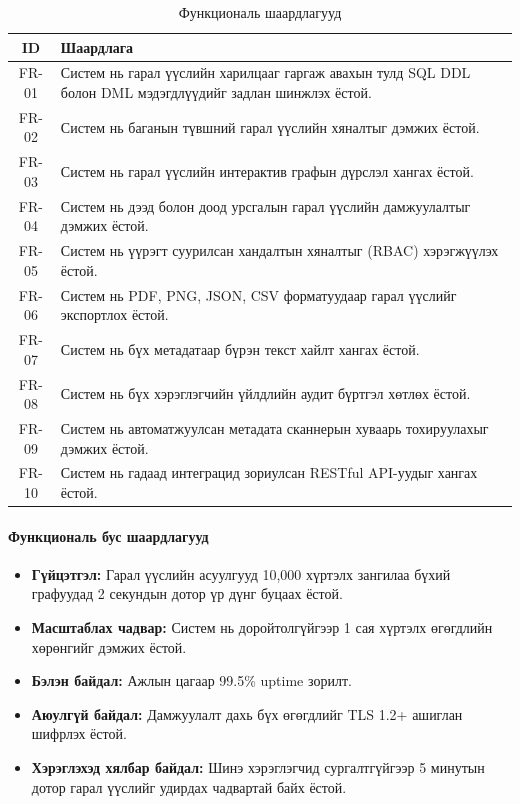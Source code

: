 \begin{table}[htbp]
\centering
\caption{Функциональ шаардлагууд}
\label{tab:functional_req}
\begin{tabular}{|c|p{10cm}|}
\hline
\textbf{ID} & \textbf{Шаардлага} \\
\hline
FR-01 & Систем нь гарал үүслийн харилцааг гаргаж авахын тулд SQL DDL болон DML мэдэгдлүүдийг задлан шинжлэх ёстой. \\
\hline
FR-02 & Систем нь баганын түвшний гарал үүслийн хяналтыг дэмжих ёстой. \\
\hline
FR-03 & Систем нь гарал үүслийн интерактив графын дүрслэл хангах ёстой. \\
\hline
FR-04 & Систем нь дээд болон доод урсгалын гарал үүслийн дамжуулалтыг дэмжих ёстой. \\
\hline
FR-05 & Систем нь үүрэгт суурилсан хандалтын хяналтыг (RBAC) хэрэгжүүлэх ёстой. \\
\hline
FR-06 & Систем нь PDF, PNG, JSON, CSV форматуудаар гарал үүслийг экспортлох ёстой. \\
\hline
FR-07 & Систем нь бүх метадатаар бүрэн текст хайлт хангах ёстой. \\
\hline
FR-08 & Систем нь бүх хэрэглэгчийн үйлдлийн аудит бүртгэл хөтлөх ёстой. \\
\hline
FR-09 & Систем нь автоматжуулсан метадата сканнерын хуваарь тохируулахыг дэмжих ёстой. \\
\hline
FR-10 & Систем нь гадаад интеграцид зориулсан RESTful API-уудыг хангах ёстой. \\
\hline
\end{tabular}
\end{table}

\paragraph{Функциональ бус шаардлагууд}

\begin{itemize}
    \item \textbf{Гүйцэтгэл:} Гарал үүслийн асуулгууд 10,000 хүртэлх зангилаа бүхий графуудад 2 секундын дотор үр дүнг буцаах ёстой.
    
    \item \textbf{Масштаблах чадвар:} Систем нь доройтолгүйгээр 1 сая хүртэлх өгөгдлийн хөрөнгийг дэмжих ёстой.
    
    \item \textbf{Бэлэн байдал:} Ажлын цагаар 99.5\% uptime зорилт.
    
    \item \textbf{Аюулгүй байдал:} Дамжуулалт дахь бүх өгөгдлийг TLS 1.2+ ашиглан шифрлэх ёстой.
    
    \item \textbf{Хэрэглэхэд хялбар байдал:} Шинэ хэрэглэгчид сургалтгүйгээр 5 минутын дотор гарал үүслийг удирдах чадвартай байх ёстой.
\end{itemize}

